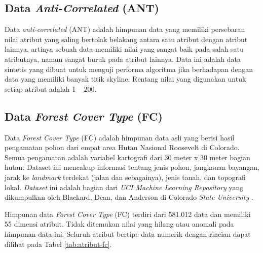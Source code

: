 \subsection{Data \textit{Anti-Correlated} (ANT)}
\tab Data \textit{anti-correlated} (ANT) adalah himpunan data yang memiliki
persebaran nilai atribut yang saling bertolak belakang antara satu
atribut dengan atribut lainnya, artinya sebuah data memiliki
nilai yang sangat baik pada salah satu atributnya, namun sangat
buruk pada atribut lainnya. Data ini adalah data sintetis yang dibuat untuk menguji performa algoritma jika berhadapan dengan data yang memiliki banyak titik skyline. Rentang nilai yang digunakan untuk setiap
atribut adalah 1 – 200.

\subsection{Data \textit{Forest Cover Type} (FC)}
\tab Data \textit{Forest Cover Type} (FC) adalah himpunan data asli yang berisi hasil pengamatan pohon dari empat area Hutan Nasional Roosevelt di Colorado. Semua pengamatan adalah variabel kartografi dari 30 meter x 30 meter bagian hutan. Dataset ini mencakup informasi tentang jenis pohon, jangkauan bayangan, jarak ke \textit{landmark} terdekat (jalan dan sebagainya), jenis tanah, dan topografi lokal. \textit{Dataset} ini adalah bagian dari \textit{UCI Machine Learning Repository} yang dikumpulkan oleh Blackard, Dean, dan Anderson di Colorado \textit{State University} \cite{fc}.

Himpunan data \textit{Forest Cover Type} (FC) terdiri dari 581.012 data dan memiliki 55 dimensi atribut. Tidak ditemukan nilai yang hilang atau anomali
pada himpunan data ini. Seluruh atribut bertipe data numerik
dengan rincian dapat dilihat pada Tabel \ref{tab:atribut-fc}.


